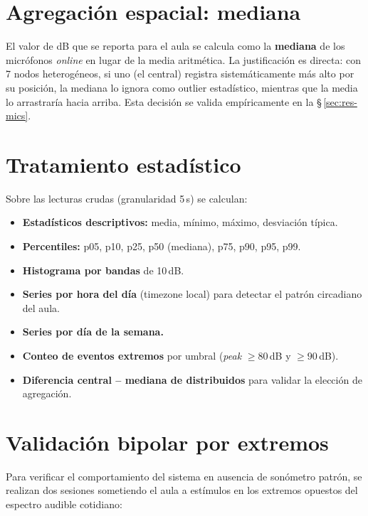 \documentclass[11pt,a4paper,openany]{report}
\begin{document}
\section{Agregaci\'on espacial: mediana}
\label{sec:agregacion}

El valor de dB que se reporta para el aula se calcula como la \textbf{mediana} de los micr\'ofonos \emph{online} en lugar de la media aritm\'etica. La justificaci\'on es directa: con 7 nodos heterog\'eneos, si uno (el central) registra sistem\'aticamente m\'as alto por su posici\'on, la mediana lo ignora como outlier estad\'istico, mientras que la media lo arrastrar\'ia hacia arriba. Esta decisi\'on se valida emp\'iricamente en la \S\,\ref{sec:res-mics}.

\section{Tratamiento estad\'istico}

Sobre las lecturas crudas (granularidad 5\,s) se calculan:

\begin{itemize}
    \item \textbf{Estad\'isticos descriptivos:} media, m\'inimo, m\'aximo, desviaci\'on t\'ipica.
    \item \textbf{Percentiles:} p05, p10, p25, p50 (mediana), p75, p90, p95, p99.
    \item \textbf{Histograma por bandas} de 10\,dB.
    \item \textbf{Series por hora del d\'ia} (timezone local) para detectar el patr\'on circadiano del aula.
    \item \textbf{Series por d\'ia de la semana.}
    \item \textbf{Conteo de eventos extremos} por umbral (\emph{peak} $\geq 80$\,dB y $\geq 90$\,dB).
    \item \textbf{Diferencia central -- mediana de distribuidos} para validar la elecci\'on de agregaci\'on.
\end{itemize}

\section{Validaci\'on bipolar por extremos}
\label{sec:bipolar}

Para verificar el comportamiento del sistema en ausencia de son\'ometro patr\'on, se realizan dos sesiones sometiendo el aula a est\'imulos en los extremos opuestos del espectro audible cotidiano:
\end{document}
